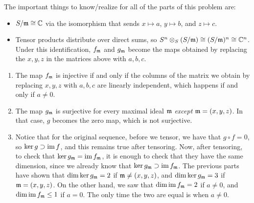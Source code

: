 \begin{solution}
The important things to know/realize for all of the parts of this problem are:
\begin{itemize}
    \item $S/\mathfrak{m} \cong \mathbb{C}$ via the isomorphism that sends $x \mapsto a$, $y \mapsto b$, and $z \mapsto c$.
    \item Tensor products distribute over direct sums, so $S^n \otimes_S (S/\mathfrak{m}) \cong (S/\mathfrak{m})^n \cong \mathbb{C}^n$. Under this identification, $f_{\mathfrak{m}}$ and $g_{\mathfrak{m}}$ become the maps obtained by replacing the $x,y,z$ in the matrices above with $a,b,c$.
\end{itemize}
\begin{enumerate}
    \item The map $f_{\mathfrak{m}}$ is injective if and only if the columns of the matrix we obtain by replacing $x,y,z$ with $a,b,c$ are linearly independent, which happens if and only if $a \neq 0$.
    \item The map $g_{\mathfrak{m}}$ is surjective for every maximal ideal $\mathfrak{m}$ \emph{except} $\mathfrak{m} = (x,y,z)$. In that case, $g$ becomes the zero map, which is not surjective.
    \item Notice that for the original sequence, before we tensor, we have that $g \circ f = 0$, so $\ker g \supset \operatorname{im} f$, and this remains true after tensoring. Now, after tensoring, to check that $\ker g_{\mathfrak{m}} = \operatorname{im} f_{\mathfrak{m}}$, it is enough to check that they have the same dimension, since we already know that $\ker g_{\mathfrak{m}} \supset \operatorname{im} f_{\mathfrak{m}}$. The previous parts have shown that $\dim \ker g_{\mathfrak{m}} = 2$ if $\mathfrak{m} \neq (x,y,z)$, and $\dim \ker g_{\mathfrak{m}} = 3$ if $\mathfrak{m} = (x,y,z)$. On the other hand, we saw that $\dim \operatorname{im} f_{\mathfrak{m}} = 2$ if $a \neq 0$, and $\dim \operatorname{im} f_{\mathfrak{m}} \leq 1$ if $a = 0$. The only time the two are equal is when $a \neq 0$.
\end{enumerate}
\end{solution}

